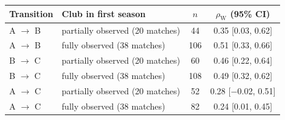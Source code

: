 \begin{tabular}{llcc}
\toprule
Transition & Club in first season & $n$ & $\rho_{\mathrm{W}}$ (95\% CI) \\
\midrule
A $\to$ B & partially observed (20 matches) & 44 & 0.35 [0.03, 0.62] \\
A $\to$ B & fully observed (38 matches) & 106 & 0.51 [0.33, 0.66] \\
B $\to$ C & partially observed (20 matches) & 60 & 0.46 [0.22, 0.64] \\
B $\to$ C & fully observed (38 matches) & 108 & 0.49 [0.32, 0.62] \\
A $\to$ C & partially observed (20 matches) & 52 & 0.28 [$-$0.02, 0.51] \\
A $\to$ C & fully observed (38 matches) & 82 & 0.24 [0.01, 0.45] \\
\bottomrule
\end{tabular}
